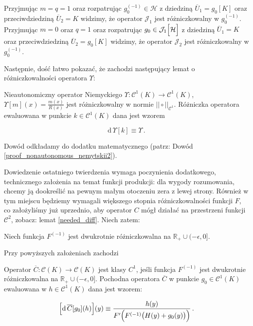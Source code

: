 Przyjmując $m=q=1$ oraz rozpatrując $g_0^{(-1)} \in \mathcal{H}$ z dziedziną $\overline{U}_1 = g_0 [K]$ oraz przeciwdziedziną $\overline{U}_2 = K$ widzimy, że operator $\mathcal{J}_1$ jest różniczkowalny w $g_0^{(-1)}$. Przyjmując $m=0$ oraz $q=1$ oraz rozpatrując $g_0 \in \mathcal{J}_1 \Bigl[\mathcal{H}\Bigl]$ z dziedziną $\overline{U}_1 = K$ oraz przeciwdziedziną $\overline{U}_2 = g_0 [K]$ widzimy, że operator $\mathcal{J}_2$ jest różniczkowalny w $g_0^{(-1)}$.   

Następnie, dość łatwo pokazać, że zachodzi następujący lemat o różniczkowalności operatora $\Upsilon$:

\begin{lemat}\label{nonautonomous_nemytskii}
	Nieautonomiczny operator Niemyckiego $\Upsilon: \mathcal{C}^{1}(K) \rightarrow \mathcal{C}^{1}(K)$, $\Upsilon[m](x)=\frac{m(x)}{R(x)}$ jest różniczkowalny w normie $|| \circ||_{\mathcal{C}^{1}}$. Różniczka operatora ewaluowana w punkcie $k \in \mathcal{C}^{1}(K)$ dana jest wzorem
	
\begin{equation*}
	\mathrm{d}\, \Upsilon[k] \equiv \Upsilon \,.
\end{equation*}	
\end{lemat}

Dowód odkładamy do dodatku matematycznego (patrz: Dowód \ref{proof_nonautonomous_nemytskii2}).

Dowiedzenie ostatniego twierdzenia wymaga poczynienia dodatkowego, technicznego założenia na temat funkcji produkcji: dla wygody rozumowania, chcemy ją dookreślić na pewnym małym otoczeniu zera z lewej strony. Również w tym miejscu będziemy wymagali większego stopnia różniczkowalności funkcji $F$, co założyliśmy już uprzednio, aby operator $C$ mógł działać na przestrzeni funkcji $\mathcal{C}^2$, zobacz: lemat \ref{needed_diff}. Niech zatem:

\begin{ass}\label{on_prod_last_time}
	Niech funkcja $F^{(-1)}$ jest dwukrotnie różniczkowalna na $\mathbb{R}_{+} \cup (-\epsilon, 0].$
\end{ass}

Przy powyższych założeniach zachodzi

\begin{lemat}\label{diff_of_C_barred_in_C_0} Operator $\overline{C}: \mathcal{C}(K) \rightarrow \mathcal{C}(K)$ jest klasy $C^1$, jeśli funkcja $F^{(-1)}$ jest dwukrotnie różniczkowalna na $\mathbb{R}_{+} \cup (-\epsilon, 0].$ Pochodna operatora $ \overline{C} $ w punkcie $ g_0 \in \mathcal{C}^{1}(K)$ ewaluowana w $ h \in \mathcal{C}^{1}(K) $ dana jest wzorem:
	
\begin{equation}
\Bigl[\mathrm{d}\, \overline{C}[g_0](h)\Bigl] (y) \equiv \frac{h(y)}{F'\Bigl( F^{(-1)}\bigl( H(y) + g_0(y)\bigl) \Bigl)} \,.
\end{equation}	
\end{lemat}

